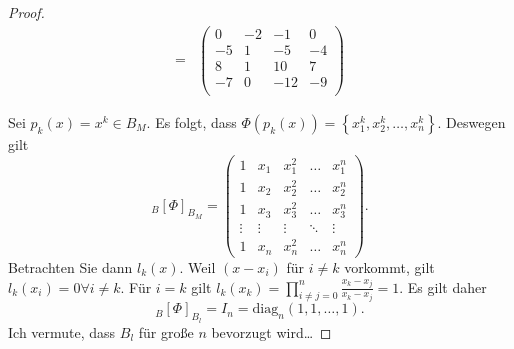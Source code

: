 \begin{proof}
\begin{align*}
	=& \left(
\begin{array}{cccc}
 0 & -2 & -1 & 0 \\
 -5 & 1 & -5 & -4 \\
 8 & 1 & 10 & 7 \\
 -7 & 0 & -12 & -9 \\
\end{array}
\right)
\end{align*}
\item Sei $p_k(x)=x^k\in B_M$. Es folgt, dass $\Phi\left( p_k(x) \right) =\left\{ x_1^k,x_2^k,\dots, x_n^k \right\} $. Deswegen gilt
	\[
		_B[\Phi]_{B_M}=\begin{pmatrix} 1 & x_1 & x_1^2 & \dots & x_1^n \\
			1 & x_2 & x_2^2 & \dots  & x_2^n\\
			1 & x_3 & x_3^2 & \dots & x_3^n\\
			\vdots & \vdots &\vdots & \ddots & \vdots\\
			1 & x_n & x_n^2 & \dots & x_n^n
		\end{pmatrix} 
	.\] 
	Betrachten Sie dann $l_k(x)$. Weil $(x-x_i)$ f\"{u}r $i\neq k$ vorkommt, gilt $l_k(x_i)=0\forall i \neq k$. F\"{u}r $i=k$ gilt $l_k(x_k)=\prod_{i\neq j = 0}^{n} \frac{x_k-x_j}{x_k-x_j}=1$. Es gilt daher
	\[
		_B[\Phi]_{B_l}=I_n=\text{diag}_n(1,1,\dots,1)
	.\]
	Ich vermute, dass $B_l$ f\"{u}r große $n$ bevorzugt wird\ldots
\end{proof}
